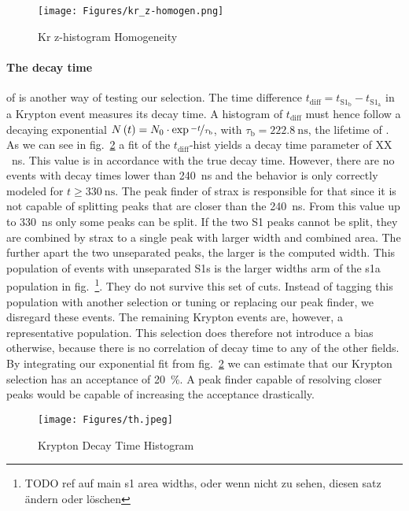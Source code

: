 \begin{figure}
\centering
\texttt{[image: Figures/kr\_z-homogen.png]}  %
\caption[Kr z-histogram Homogeneity]{
    Kr z-histogram Homogeneity
    }
\label{fig:z-hist-homogen}
\end{figure}



\paragraph{The decay time} of  is another way of testing our selection.
The time difference $ t_\mathrm{diff} = t_{\mathrm{S}1_\mathrm{b}} - t_{\mathrm{S}1_\mathrm{a}} $ in a Krypton event measures its decay time.
A histogram of $ t_\mathrm{diff} $ must hence follow a decaying exponential $ N \left( t \right) = N_0 \cdot \exp{\nicefrac{-t}{\tau_\mathrm{b}}} $, with $ \tau_\mathrm{b} = \SI{222.8}{\nano\s} $, the lifetime of .
As we can see in fig.~\ref{fig:kr-decaytime} a fit of the $ t_\mathrm{diff} $-hist yields a decay time parameter of XX \SI{}{\nano\s}. %
This value is in accordance with the true decay time. %
However, there are no events with decay times lower than \SI{240}{\nano\s} and the behavior is only correctly modeled for $ t \ge \SI{330}{\nano\s} $.
The peak finder of strax is responsible for that since it is not capable of splitting peaks that are closer than the \SI{240}{\nano\s}.
From this value up to \SI{330}{\nano\s} only some peaks can be split.
If the two S1 peaks cannot be split, they are combined by strax to a single peak with larger width and combined area.
The further apart the two unseparated peaks, the larger is the computed width.
This population of events with unseparated S1s is the larger widths arm of the \gls{s1a} population in fig.~\footnote{TODO ref auf main s1 area widths, oder wenn nicht zu sehen, diesen satz ändern oder löschen}.
They do not survive this set of cuts.
Instead of tagging this population with another selection or tuning or replacing our peak finder, we disregard these events.
The remaining Krypton events are, however, a representative population.
This selection does therefore not introduce a bias otherwise, because there is no correlation of decay time to any of the other fields.
By integrating our exponential fit from fig.~\ref{fig:kr-decaytime} we can estimate that our Krypton selection has an acceptance of \SI{20}{\%}.
A peak finder capable of resolving closer peaks would be capable of increasing the acceptance drastically.


\begin{figure}
\centering
\texttt{[image: Figures/th.jpeg]}  %
\caption[Krypton Decay Time Histogram]{
    Krypton Decay Time Histogram
    }
\label{fig:kr-decaytime}
\end{figure}



\FloatBarrier

